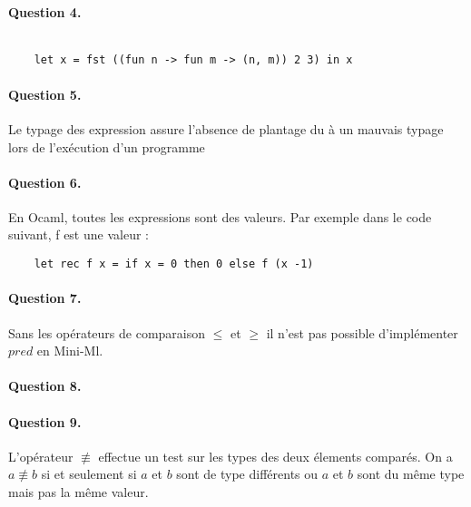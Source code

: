 \documentclass{article}
\begin{document}

	\paragraph{Question 4.}

	\begin{verbatim}

	let x = fst ((fun n -> fun m -> (n, m)) 2 3) in x

	\end{verbatim}

	\paragraph{Question 5.}

	Le typage des expression assure l'absence de plantage du à un mauvais typage
	lors de l'exécution d'un programme

	\paragraph{Question 6.}

	En Ocaml, toutes les expressions sont des valeurs. Par exemple dans le code suivant, f est une valeur :
	\begin{verbatim}
	let rec f x = if x = 0 then 0 else f (x -1)
	\end{verbatim}

	\paragraph{Question 7.}

	Sans les opérateurs de comparaison $\le$ et $\ge$ il n'est pas possible d'implémenter $pred$ en Mini-Ml.

	\paragraph{Question 8.}



	\paragraph{Question 9.}

	L'opérateur $\not\equiv$ effectue un test sur les types des deux élements comparés. On a $a \not\equiv b$ si et seulement si $a$ et $b$ sont de type différents ou $a$ et $b$ sont du même type mais pas la même valeur.
\end{document}

